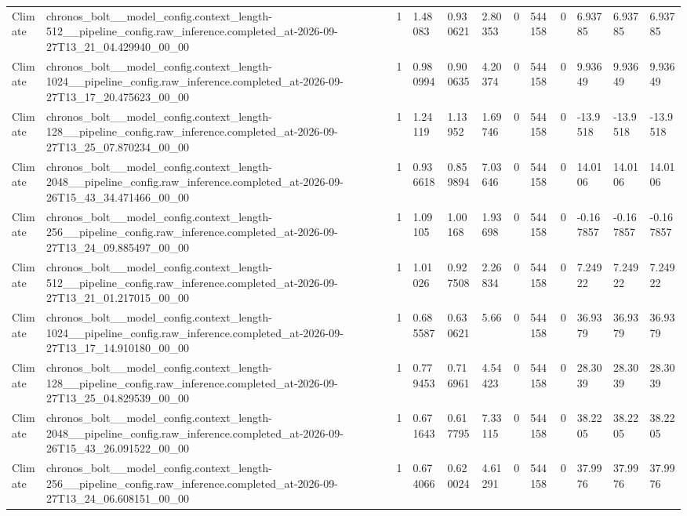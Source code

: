 \begin{tabular}{llllllllllll}
Climate & chronos\_bolt\_\_model\_config.context\_length-512\_\_pipeline\_config.raw\_inference.completed\_at-2026-09-27T13\_21\_04.429940\_00\_00 & 1 & 1.48083 & 0.930621 & 2.80353 & 0 & 544158 & 0 & 6.93785 & 6.93785 & 6.93785 \\
Climate & chronos\_bolt\_\_model\_config.context\_length-1024\_\_pipeline\_config.raw\_inference.completed\_at-2026-09-27T13\_17\_20.475623\_00\_00 & 1 & 0.980994 & 0.900635 & 4.20374 & 0 & 544158 & 0 & 9.93649 & 9.93649 & 9.93649 \\
Climate & chronos\_bolt\_\_model\_config.context\_length-128\_\_pipeline\_config.raw\_inference.completed\_at-2026-09-27T13\_25\_07.870234\_00\_00 & 1 & 1.24119 & 1.13952 & 1.69746 & 0 & 544158 & 0 & -13.9518 & -13.9518 & -13.9518 \\
Climate & chronos\_bolt\_\_model\_config.context\_length-2048\_\_pipeline\_config.raw\_inference.completed\_at-2026-09-26T15\_43\_34.471466\_00\_00 & 1 & 0.936618 & 0.859894 & 7.03646 & 0 & 544158 & 0 & 14.0106 & 14.0106 & 14.0106 \\
Climate & chronos\_bolt\_\_model\_config.context\_length-256\_\_pipeline\_config.raw\_inference.completed\_at-2026-09-27T13\_24\_09.885497\_00\_00 & 1 & 1.09105 & 1.00168 & 1.93698 & 0 & 544158 & 0 & -0.167857 & -0.167857 & -0.167857 \\
Climate & chronos\_bolt\_\_model\_config.context\_length-512\_\_pipeline\_config.raw\_inference.completed\_at-2026-09-27T13\_21\_01.217015\_00\_00 & 1 & 1.01026 & 0.927508 & 2.26834 & 0 & 544158 & 0 & 7.24922 & 7.24922 & 7.24922 \\
Climate & chronos\_bolt\_\_model\_config.context\_length-1024\_\_pipeline\_config.raw\_inference.completed\_at-2026-09-27T13\_17\_14.910180\_00\_00 & 1 & 0.685587 & 0.630621 & 5.66 & 0 & 544158 & 0 & 36.9379 & 36.9379 & 36.9379 \\
Climate & chronos\_bolt\_\_model\_config.context\_length-128\_\_pipeline\_config.raw\_inference.completed\_at-2026-09-27T13\_25\_04.829539\_00\_00 & 1 & 0.779453 & 0.716961 & 4.54423 & 0 & 544158 & 0 & 28.3039 & 28.3039 & 28.3039 \\
Climate & chronos\_bolt\_\_model\_config.context\_length-2048\_\_pipeline\_config.raw\_inference.completed\_at-2026-09-26T15\_43\_26.091522\_00\_00 & 1 & 0.671643 & 0.617795 & 7.33115 & 0 & 544158 & 0 & 38.2205 & 38.2205 & 38.2205 \\
Climate & chronos\_bolt\_\_model\_config.context\_length-256\_\_pipeline\_config.raw\_inference.completed\_at-2026-09-27T13\_24\_06.608151\_00\_00 & 1 & 0.674066 & 0.620024 & 4.61291 & 0 & 544158 & 0 & 37.9976 & 37.9976 & 37.9976 \\

\end{tabular}
